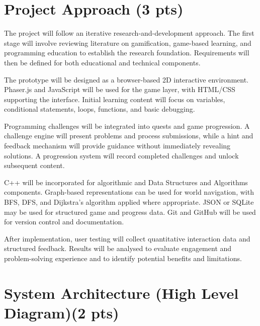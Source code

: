 \documentclass[12pt,a4paper]{article}
\begin{document}
\newpage
\section*{Project Approach (3 pts)}
The project will follow an iterative research-and-development approach. The first stage will involve reviewing literature on gamification, game-based learning, and programming education to establish the research foundation. Requirements will then be defined for both educational and technical components.

The prototype will be designed as a browser-based 2D interactive environment. Phaser.js and JavaScript will be used for the game layer, with HTML/CSS supporting the interface. Initial learning content will focus on variables, conditional statements, loops, functions, and basic debugging.

Programming challenges will be integrated into quests and game progression. A challenge engine will present problems and process submissions, while a hint and feedback mechanism will provide guidance without immediately revealing solutions. A progression system will record completed challenges and unlock subsequent content.

C++ will be incorporated for algorithmic and Data Structures and Algorithms components. Graph-based representations can be used for world navigation, with BFS, DFS, and Dijkstra's algorithm applied where appropriate. JSON or SQLite may be used for structured game and progress data. Git and GitHub will be used for version control and documentation.

After implementation, user testing will collect quantitative interaction data and structured feedback. Results will be analysed to evaluate engagement and problem-solving experience and to identify potential benefits and limitations.

\newpage
\section*{System Architecture (High Level Diagram)(2 pts)}
\end{document}
